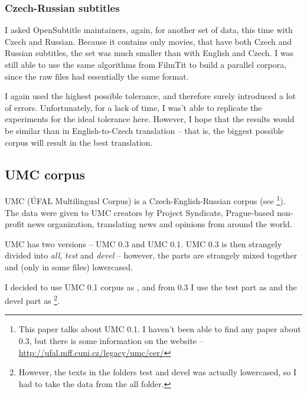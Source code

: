 \subsubsection{Czech-Russian subtitles}

I asked OpenSubtitle maintainers, again, for another set of data, this time with Czech and Russian.
Because it contains only movies, that have both Czech and Russian subtitles, the set was much smaller than with English and Czech. I was still able to use the same algorithms from FilmTit to build a parallel corpora, since the raw files had essentially the same format.

I again used the highest possible tolerance, and therefore surely introduced a lot of errors. Unfortunately, for a lack of time, I was't able to replicate the experiments for the ideal tolerance here. However, I hope that the results would be similar than in English-to-Czech translation -- that is, the biggest possible corpus will result in the best translation.



\subsection{UMC corpus}
\label{corpora:umc}
UMC (ÚFAL Multilingual Corpus) is a Czech-English-Russian corpus (see \cite{umc}\footnote{This paper talks about UMC 0.1. I haven't been able to find any paper about 0.3, but there is some information on the website -- \url{http://ufal.mff.cuni.cz/legacy/umc/cer/}}). The data were given to UMC creators by Project Syndicate, Prague-based non-profit news organization, translating news and opinions from around the world.

UMC has two versions -- UMC 0.3 and UMC 0.1. UMC 0.3 is then strangely divided into \emph{all}, \emph{test} and \emph{devel} -- however, the parts are strangely mixed together and (only in some files) lowercased.

I decided to use UMC 0.1 corpus as , and from 0.3 I use the test part as  and the devel part as \footnote{However, the texts in the folders test and devel was actually lowercased, so I had to take the data from the all folder.}.


